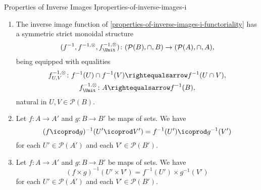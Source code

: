 \begin{proposition}{Properties of Inverse Images I}{properties-of-inverse-images-i}
\begin{enumerate}
            \[
                (f^{-1},f^{-1,\otimes},f^{-1,\otimes}_{\Unit})
                \colon
                (\mathcal{P}(B),\cup,\emptyset)
                \to
                (\mathcal{P}(A),\cup,\emptyset),
            \]%
            being equipped with equalities%
            \[
                \begin{gathered}
                    f^{-1,\otimes}_{U,V}   \colon f^{-1}(U)\cup f^{-1}(V) \rightequalsarrow f^{-1}(U\cup V),\\
                    f^{-1,\otimes}_{\Unit} \colon \emptyset               \rightequalsarrow f^{-1}(\emptyset),
                \end{gathered}
            \]%
            natural in $U,V\in\mathcal{P}(B)$.
        \item\label{properties-of-inverse-images-i-symmetric-strict-monoidality-with-respect-to-intersections}The inverse image function of \cref{properties-of-inverse-images-i-functoriality} has a symmetric strict monoidal structure
            \[
                (f^{-1},f^{-1,\otimes},f^{-1,\otimes}_{\Unit})
                \colon
                (\mathcal{P}(B),\cap,B)
                \to
                (\mathcal{P}(A),\cap,A),
            \]%
            being equipped with equalities%
            \[
                \begin{gathered}
                    f^{-1,\otimes}_{U,V}   \colon f^{-1}(U)\cap f^{-1}(V) \rightequalsarrow f^{-1}(U\cap V),\\
                    f^{-1,\otimes}_{\Unit} \colon A                       \rightequalsarrow f^{-1}(B),
                \end{gathered}
            \]%
            natural in $U,V\in\mathcal{P}(B)$.
        \item\label{properties-of-inverse-images-i-interaction-with-coproducts}Let $f\colon A\to A'$ and $g\colon B\to B'$ be maps of sets. We have
            \[
                (f\icoprod g)^{-1}(U'\icoprod V')%
                =%
                f^{-1}(U')\icoprod g^{-1}(V')
            \]%
            for each $U'\in\mathcal{P}(A')$ and each $V'\in\mathcal{P}(B')$.
        \item\label{properties-of-inverse-images-i-interaction-with-products}Let $f\colon A\to A'$ and $g\colon B\to B'$ be maps of sets. We have
            \[
                (f\times g)^{-1}(U'\times V')%
                =%
                f^{-1}(U')\times g^{-1}(V')%
            \]%
            for each $U'\in\mathcal{P}(A')$ and each $V'\in\mathcal{P}(B')$.
    \end{enumerate}
\end{proposition}
